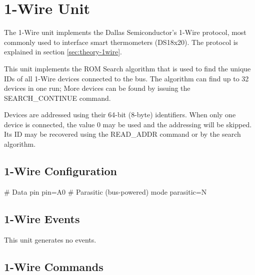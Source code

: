 \section{1-Wire Unit}

The 1-Wire unit implements the Dallas Semiconductor's 1-Wire protocol, most commonly used to interface smart thermometers (DS18x20). The protocol is explained in section \ref{sec:theory-1wire}. 

This unit implements the ROM Search algorithm that is used to find the unique IDs of all 1-Wire devices connected to the bus. The algorithm can find up to 32 devices in one run; More devices can be found by issuing the SEARCH\_CONTINUE command.

Devices are addressed using their 64-bit (8-byte) identifiers. When only one device is connected, the value 0 may be used and the addressing will be skipped. Its ID may be recovered using the READ\_ADDR command or by the search algorithm.

\subsection{1-Wire Configuration}

\begin{inicode}
[1WIRE:ow@7]
# Data pin
pin=A0
# Parasitic (bus-powered) mode
parasitic=N
\end{inicode}

\subsection{1-Wire Events}

This unit generates no events.

\subsection{1-Wire Commands}

